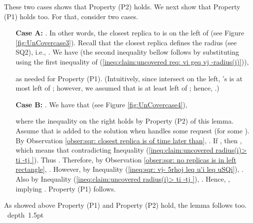 \documentclass[11pt]{article}
\def\blackslug{\hbox{\hskip 1pt \vrule width 4pt height 8pt
    depth 1.5pt \hskip 1pt}}
\def\QED{\quad\blackslug\lower 8.5pt\null\par}
\begin{document}
\noindent
These two cases shows that Property (P2) holds.
We next show that Property (P1) holds too.
For that, consider two cases.




\begin{itemize}

\item [{\bf Case A:}] .
In other words, the closest replica  to  is on the left of 
(see Figure \ref{fig:UnCovercase3}).
Recall that the closest replica  defines the radius  (see SQ2), i.e.,
.
We have
(the second inequality bellow follows by substituting  using the first inequality of (\ref{ineq:claim:uncovered req: vi geq vj -radius(j)})),

as needed for Property (P1).
(Intuitively, since  intersect  on the left, 's is at most  left of ;
however, we assumed that  is at least  left of ;
hence, .)




\item [{\bf Case B:}] .
We have that (see Figure \ref{fig:UnCovercase4}),

where the inequality on the right holds by Property (P2) of this lemma.
Assume that  is added to the solution when  handles some request  (for some ).
By Observation \ref{obser:sqr: closest replica is of time later than}, .
If , then , which means that 
contradicting Inequality (\ref{ineq:claim:uncovered radius(i)> ti -tj }).
Thus .
Therefore, by Observation \ref{obser:sqr: no replicas is in left rectangle},
.
However, by Inequality (\ref{ineq:sqr: vj- 5rhoj leq u'i leq uSQi}),
.
Also by Inequality (\ref{ineq:claim:uncovered radius(i)> ti -tj }), .
Hence, ,
implying . Property (P1) follows.


\end{itemize}
As showed above Property (P1) and Property (P2) hold, the lemma follows too.
\QED
\end{document}
